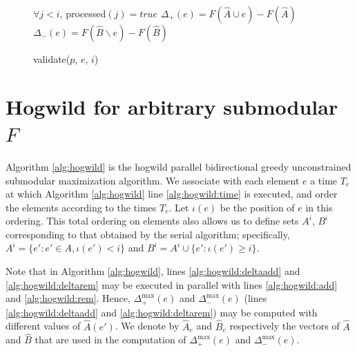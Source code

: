 \documentclass{article} %
\begin{document}
\begin{figure}[h]
\begin{multicols}{2}
\begin{minipage}{0.49\textwidth}
\begin{algorithm}[H]
\DontPrintSemicolon
\caption{validate($p$, $e$, $i$)}
\label{alg:occvalidate}
  \WaitUntil $\forall j < i$, processed$(j) = true$\;
  $\Delta_+(e) = F(\hat{A} \cup e) - F(\hat{A})$\;
  $\Delta_-(e) = F(\hat{B} \backslash e) - F(\hat{B})$\;
\end{algorithm}


  \label{fig:submax}
    \end{minipage}
    
    
    
  \end{multicols}
\end{figure}








\section{Hogwild for arbitrary submodular $F$}
Algorithm \ref{alg:hogwild} is the hogwild parallel bidirectional greedy unconstrained submodular maximization algorithm.
We associate with each element $e$ a time $T_e$ at which Algorithm \ref{alg:hogwild} line \ref{alg:hogwild:time} is executed, and order the elements according to the times $T_e$.
Let $\iota(e)$ be the position of $e$ in this ordering.
This total ordering on elements also allows us to define sets $A^i$, $B^i$ corresponding to that obtained by the serial algorithm;
specifically, $A^i = \{e' : e' \in A, \iota(e') < i\}$ and $B^i = A^i \cup \{e': \iota(e') \geq i\}$.

Note that in Algorithm \ref{alg:hogwild}, lines \ref{alg:hogwild:deltaadd} and \ref{alg:hogwild:deltarem} may be executed in parallel with lines \ref{alg:hogwild:add} and \ref{alg:hogwild:rem}.
Hence, $\Delta_+^{\max}(e)$ and $\Delta_-^{\max}(e)$ (lines \ref{alg:hogwild:deltaadd} and \ref{alg:hogwild:deltarem}) may be computed with different values of $\hat{A}(e')$.
We denote by $\hat{A}_e$ and $\hat{B}_e$ respectively the vectors of $\hat{A}$ and $\hat{B}$ that are used in the computation of $\Delta_+^{\max}(e)$ and $\Delta_-^{\max}(e)$.
\end{document}
